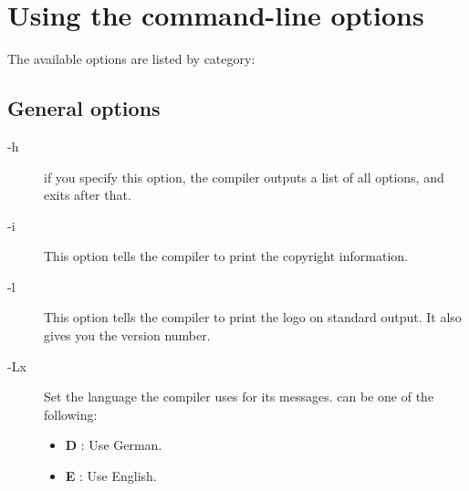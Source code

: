 \documentclass{report}
\newcommand{\olabel}[1]{\label{option:#1}}
\begin{document}
\section{Using the command-line options}

The available options are listed by category:

%
%

\subsection{General options}
\begin{description}
\item[-h] if you specify this option, the compiler outputs a list of all options, 
and exits after that.
\olabel{h}
\item[-i] This option tells the compiler to print the copyright information.
\olabel{i}
\item[-l] This option tells the compiler to print the \fpk logo on standard
output. It also gives you the \fpk version number.
\olabel{l}
\item[-Lx] Set the language the compiler uses for its messages. 
\olabel{L}
 can be one of the following:
\begin{itemize}
\item \textbf{D} : Use German.
\item \textbf{E} : Use English.
\end{itemize}
\end{description}

%
%

\end{document}
